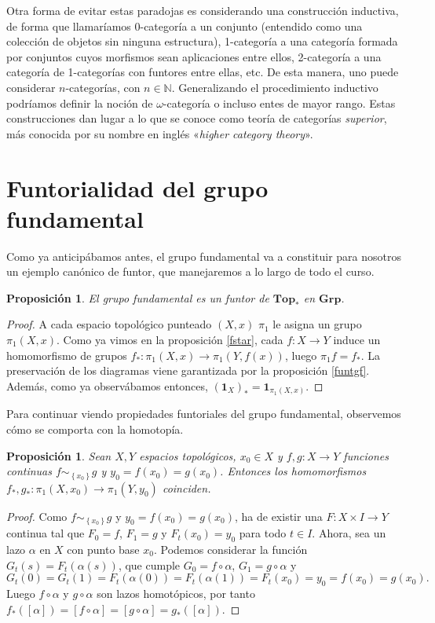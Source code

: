 \documentclass[12pt,a4paper]{book}
\newtheorem{prop}[thm]{Proposición}
\theoremstyle{definition} \newtheorem{defn}[thm]{Definición}
\theoremstyle{definition} \newtheorem{ejemplo}[thm]{Ejemplo}
\theoremstyle{definition} \newtheorem{ejercicio}[thm]{Ejercicio}
\theoremstyle{remark} \newtheorem*{obs}{Observación}
\def\id{\mathbf{1}}
\def\gf{\pi_1}
\def\top{\mathbf{Top}}
\def\grp{\mathbf{Grp}}
\begin{document}
Otra forma de evitar estas paradojas es considerando una construcción inductiva, de forma que llamaríamos 0-categoría a un conjunto (entendido como una colección de objetos sin ninguna estructura), 1-categoría a una categoría formada por conjuntos cuyos morfismos sean aplicaciones entre ellos, 2-categoría a una categoría de 1-categorías con funtores entre ellas, etc. De esta manera, uno puede considerar $n$-categorías, con $n\in \mathbb{N}$. Generalizando el procedimiento inductivo podríamos definir la noción de $\omega$-categoría o incluso entes de mayor rango. Estas construcciones dan lugar a lo que se conoce como teoría de categorías \emph{superior}, más conocida por su nombre en inglés «\emph{higher category theory}».

\section{Funtorialidad del grupo fundamental}

Como ya anticipábamos antes, el grupo fundamental va a constituir para nosotros un ejemplo canónico de funtor, que manejaremos a lo largo de todo el curso.

\begin{prop}
  El grupo fundamental es un funtor de $\top_*$ en $\grp$.
\end{prop}
\begin{proof}
  A cada espacio topológico punteado $(X,x)$ $\gf$ le asigna un grupo $\gf(X,x)$. Como ya vimos en la proposición \ref{fstar}, cada $f:X\rightarrow Y$ induce un homomorfismo de grupos $f_*:\gf(X,x)\rightarrow \gf(Y,f(x))$, luego $\gf f=f_*$. La preservación de los diagramas viene garantizada por la proposición \ref{funtgf}. Además, como ya observábamos entonces, $(\id_X)_*=\id_{\gf(X,x)}$.
\end{proof}

Para continuar viendo propiedades funtoriales del grupo fundamental, observemos cómo se comporta con la homotopía.

\begin{prop}
  Sean $X,Y$ espacios topológicos, $x_0\in X$ y $f,g:X\rightarrow Y$ funciones continuas $f\sim_{\left\{x_0 \right\}}g$ y $y_0=f(x_0)=g(x_0)$. Entonces los homomorfismos $f_*,g_*:\gf(X,x_0)\rightarrow \gf(Y,y_0)$ coinciden.
\end{prop}
\begin{proof}
  Como $f\sim_{\left\{x_0 \right\}}g$ y $y_0=f(x_0)=g(x_0)$, ha de existir una $F:X\times I \rightarrow Y$ continua tal que $F_0=f$, $F_1=g$ y $F_t(x_0)=y_0$ para todo $t \in I$. Ahora, sea un lazo $\alpha$ en $X$ con punto base $x_0$. Podemos considerar la función $G_t(s)=F_t(\alpha(s))$, que cumple $G_0=f\circ \alpha$, $G_1=g \circ \alpha$ y $$G_t(0)=G_t(1)=F_t(\alpha(0))=F_t(\alpha(1))=F_t(x_0)=y_0=f(x_0)=g(x_0).$$ Luego $f\circ \alpha$ y $g \circ \alpha$ son lazos homotópicos, por tanto $f_*([\alpha])=[f\circ \alpha]=[g\circ \alpha]=g_*([\alpha])$.
\end{proof}
\end{document}
